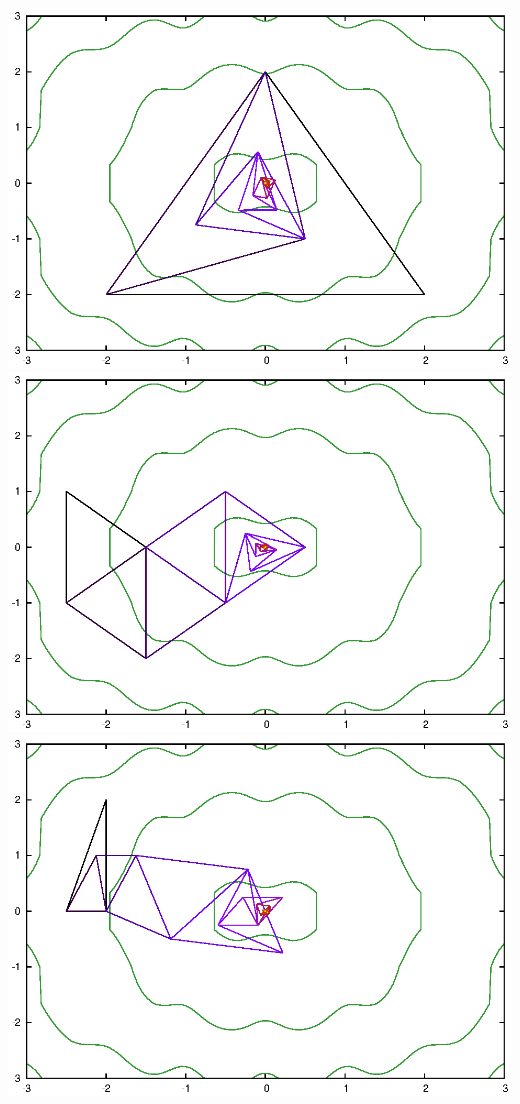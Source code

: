 \documentclass[12pt]{article}
\theoremstyle{plain}
\theoremstyle{remark}
\theoremstyle{definition}
\begin{document}
 \noindent
\includegraphics[scale=0.6]{ackley1.eps}
\includegraphics[scale=0.6]{ackley2.eps}
\includegraphics[scale=0.6]{ackley3.eps}
\end{document}
